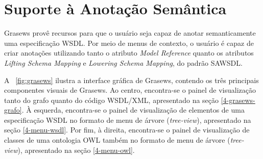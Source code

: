 \section{Suporte à Anotação Semântica}\label{4-grasews-suporte-anotacao}

Grasews provê recursos para que o usuário seja capaz de anotar semanticamente uma especificação WSDL. Por meio de menus de contexto, o usuário é capaz de criar anotações utilizando tanto o atributo \textit{Model Reference} quanto os atributos \textit{Lifting Schema Mapping} e \textit{Lowering Schema Mapping}, do padrão SAWSDL.

A \figurename~\ref{fig:grasews} ilustra a interface gráfica de Grasews, contendo os três principais componentes visuais de Grasews. Ao centro, encontra-se o painel de visualização tanto do grafo quanto do código WSDL/XML, apresentado na seção \ref{4-grasews-grafo}. À esquerda, encontra-se o painel de visualização de elementos de uma especificação WSDL no formato de menu de árvore (\textit{tree-view}), apresentado na seção \ref{4-menu-wsdl}. Por fim, à direita, encontra-se o painel de visualização de classes de uma ontologia OWL também no formato de menu de árvore (\textit{tree-view}), apresentado na seção \ref{4-menu-owl}.


